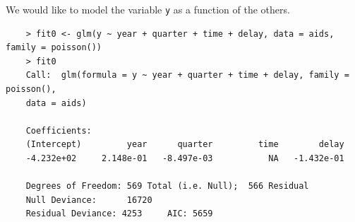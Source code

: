 \documentclass[11pt,a4paper%
addpoints, 
]{exam}
\begin{document}
We would like to model the variable \texttt{y} as a function of the others.




\begin{center}
	\begin{verbatim}
	> fit0 <- glm(y ~ year + quarter + time + delay, data = aids, family = poisson())
	> fit0
	Call:  glm(formula = y ~ year + quarter + time + delay, family = poisson(), 
	data = aids)
	
	Coefficients:
	(Intercept)         year      quarter         time        delay  
	-4.232e+02     2.148e-01   -8.497e-03           NA   -1.432e-01  
	
	Degrees of Freedom: 569 Total (i.e. Null);  566 Residual
	Null Deviance:	    16720 
	Residual Deviance: 4253 	AIC: 5659
	\end{verbatim}
\end{center}
\end{document}
